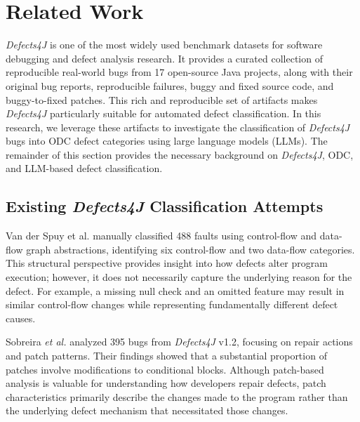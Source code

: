 \section{Related Work}
\label{sec:related}


\textit{Defects4J} \citep{just2014defects4j} is one of the most widely used benchmark datasets for software debugging and defect analysis research. It provides a curated collection of reproducible real-world bugs from 17 open-source Java projects, along with their original bug reports, reproducible failures, buggy and fixed source code, and buggy-to-fixed patches. This rich and reproducible set of artifacts makes \textit{Defects4J} particularly suitable for automated defect classification. In this research, we leverage these artifacts to investigate the classification of \textit{Defects4J} bugs into ODC defect categories using large language models (LLMs). The remainder of this section provides the necessary background on \textit{Defects4J}, ODC, and LLM-based defect classification.

\subsection{Existing \textit{Defects4J} Classification Attempts}


Van der Spuy et al. \citep{vanderspuy2025anatomy} manually classified 488 faults using control-flow and data-flow graph abstractions, identifying six control-flow and two data-flow categories. This structural perspective provides insight into how defects alter program execution; however, it does not necessarily capture the underlying reason for the defect. For example, a missing null check and an omitted feature may result in similar control-flow changes while representing fundamentally different defect causes.

Sobreira \textit{et al.} \citep{sobreira2018dissection} analyzed 395 bugs from \textit{Defects4J} v1.2, focusing on repair actions and patch patterns. Their findings showed that a substantial proportion of patches involve modifications to conditional blocks. Although patch-based analysis is valuable for understanding how developers repair defects, patch characteristics primarily describe the changes made to the program rather than the underlying defect mechanism that necessitated those changes.

